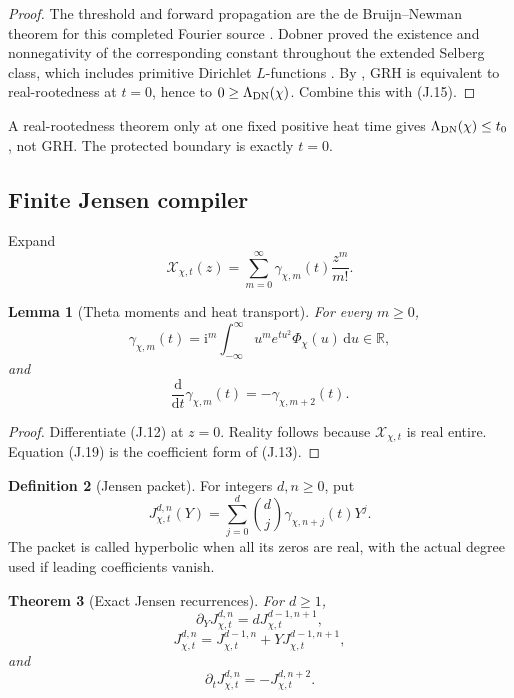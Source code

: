 \documentclass[11pt]{article}
\newtheorem{theorem}{Theorem}[section]
\newtheorem{lemma}[theorem]{Lemma}
\theoremstyle{definition}
\newtheorem{definition}[theorem]{Definition}
\theoremstyle{remark}
\newcommand{\R}{\mathbb R}
\newcommand{\dd}{\mathrm d}
\begin{document}
\begin{proof}
The threshold and forward propagation are the de Bruijn--Newman theorem for
this completed Fourier source \cite{deBruijn,Newman}.  Dobner proved the
existence and nonnegativity of the corresponding constant throughout the
extended Selberg class, which includes primitive Dirichlet $L$-functions
\cite{Dobner}.  By , GRH is equivalent to
real-rootedness at $t=0$, hence to $0\ge\Lambda_{\rm DN}(\chi)$.  Combine
this with \textup{(J.15)}.
\end{proof}

A real-rootedness theorem only at one fixed positive heat time gives
$\Lambda_{\rm DN}(\chi)\le t_0$, not GRH.  The protected boundary is exactly
$t=0$.

\subsection{Finite Jensen compiler}

Expand
\[
 \mathscr X_{\chi,t}(z)
 =\sum_{m=0}^\infty\gamma_{\chi,m}(t)\frac{z^m}{m!}.
 \tag{J.17}
\]

\begin{lemma}[Theta moments and heat transport]
\label{lem:theta-moments}
For every $m\ge0$,
\[
 \boxed{
 \gamma_{\chi,m}(t)
 =\mathrm i^m\int_{-\infty}^{\infty}
  u^m e^{tu^2}\Phi_\chi(u)\,\dd u\in\R,}
 \tag{J.18}
\]
and
\[
 \boxed{
 \frac{\dd}{\dd t}\gamma_{\chi,m}(t)
 =-\gamma_{\chi,m+2}(t).}
 \tag{J.19}
\]
\end{lemma}

\begin{proof}
Differentiate \textup{(J.12)} at $z=0$.  Reality follows because
$\mathscr X_{\chi,t}$ is real entire.  Equation \textup{(J.19)} is the
coefficient form of \textup{(J.13)}.
\end{proof}

\begin{definition}[Jensen packet]
\label{def:theta-Jensen}
For integers $d,n\ge0$, put
\[
 \boxed{
 J_{\chi,t}^{d,n}(Y)
 =\sum_{j=0}^d\binom dj\gamma_{\chi,n+j}(t)Y^j.}
 \tag{J.20}
\]
The packet is called hyperbolic when all its zeros are real, with the actual
degree used if leading coefficients vanish.
\end{definition}

\begin{theorem}[Exact Jensen recurrences]
\label{thm:theta-Jensen-recurrences}
For $d\ge1$,
\[
 \boxed{
 \partial_YJ_{\chi,t}^{d,n}
 =dJ_{\chi,t}^{d-1,n+1},}
 \tag{J.21}
\]
\[
 \boxed{
 J_{\chi,t}^{d,n}
 =J_{\chi,t}^{d-1,n}
  +YJ_{\chi,t}^{d-1,n+1},}
 \tag{J.22}
\]
and
\[
 \boxed{
 \partial_tJ_{\chi,t}^{d,n}
 =-J_{\chi,t}^{d,n+2}.}
 \tag{J.23}
\]
\end{theorem}
\end{document}
